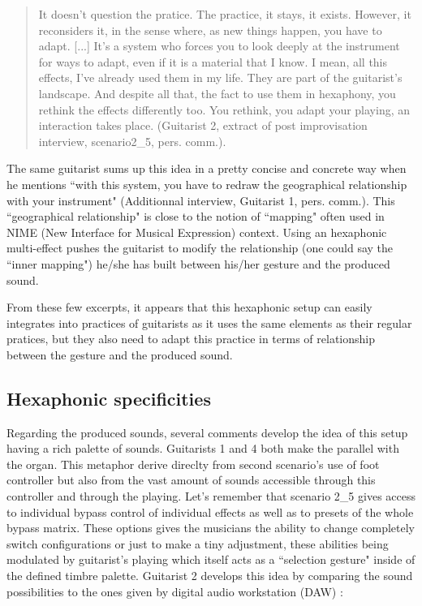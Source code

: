 \documentclass{article}
\begin{document}
    \begin{quote}
     It doesn't question the pratice. The practice, it stays, it exists. However, it reconsiders it, in the sense where, as new things happen, you have to adapt. [...] It's a system who forces you to look deeply at the instrument for ways to adapt, even if it is a material that I know. I mean, all this effects, I've already used them in my life. They are part of the guitarist's landscape. And despite all that, the fact to use them in hexaphony, you rethink the effects differently too. You rethink, you adapt your playing, an interaction takes place. (Guitarist 2, extract of post improvisation interview, scenario2\_5, pers. comm.).
    \end{quote}

The same guitarist sums up this idea in a pretty concise and concrete way when he mentions ``with this system, you have to redraw the geographical relationship with your instrument" (Additionnal interview, Guitarist 1, pers. comm.). This ``geographical relationship" is close to the notion of ``mapping" often used in NIME (New Interface for Musical Expression) context. Using an hexaphonic multi-effect pushes the guitarist to modify the relationship (one could say the ``inner mapping") he/she has built between his/her gesture and the produced sound. 

From these few excerpts, it appears that this hexaphonic setup can easily integrates into practices of guitarists as it uses the same elements as their regular pratices, but they also need to adapt this practice in terms of relationship between the gesture and the produced sound.




\subsection{Hexaphonic specificities}

Regarding the produced sounds, several comments develop the idea of this setup having a rich palette of sounds. Guitarists 1 and 4 both make the parallel with the organ. This metaphor derive direclty from second scenario's use of foot controller but also from the vast amount of sounds accessible through this controller  and through the playing.  Let's remember that scenario 2\_5 gives access to individual bypass control of individual effects as well as to presets of the whole bypass matrix. These options gives the musicians the ability to change completely switch configurations or just to make a tiny adjustment, these abilities being modulated by guitarist's playing which itself acts as a ``selection gesture" \cite{sci:Cadoz94} inside of the defined timbre palette.
Guitarist 2 develops this idea by comparing the sound possibilities to the ones given by digital audio workstation (DAW) : 
\end{document}
